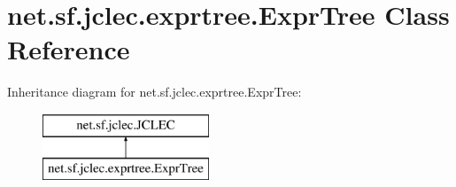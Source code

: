 \hypertarget{classnet_1_1sf_1_1jclec_1_1exprtree_1_1_expr_tree}{\section{net.\-sf.\-jclec.\-exprtree.\-Expr\-Tree Class Reference}
\label{classnet_1_1sf_1_1jclec_1_1exprtree_1_1_expr_tree}
}
Inheritance diagram for net.\-sf.\-jclec.\-exprtree.\-Expr\-Tree\-:\begin{figure}[H]
\begin{center}
\leavevmode
\includegraphics[height=2.000000cm]{classnet_1_1sf_1_1jclec_1_1exprtree_1_1_expr_tree}
\end{center}
\end{figure}
